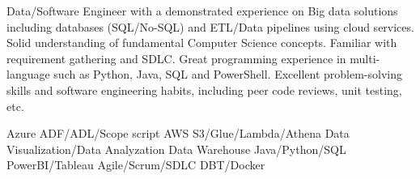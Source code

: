 \documentclass[a4paper]{ReadableCV}
\begin{document}






\showHeader{}



Data/Software Engineer with a demonstrated experience on Big data solutions including databases (SQL/No-SQL) and ETL/Data pipelines using cloud services. Solid understanding of fundamental Computer Science concepts. Familiar with requirement gathering and SDLC. Great programming experience in multi-language such as Python, Java, SQL and PowerShell. Excellent problem-solving skills and software engineering habits, including peer code reviews, unit testing, etc.


{Azure ADF/ADL/Scope script}
{AWS S3/Glue/Lambda/Athena}
{Data Visualization/Data Analyzation}
{Data Warehouse}
{Java/Python/SQL}
{PowerBI/Tableau}
{Agile/Scrum/SDLC}
{DBT/Docker}


\end{document}
